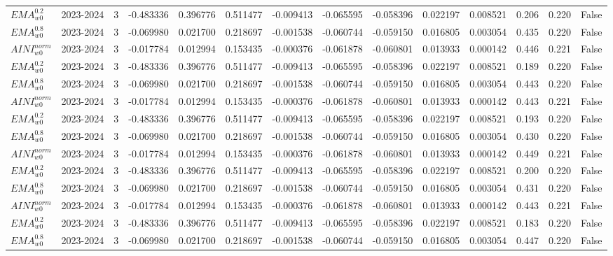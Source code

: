 \begin{tabular}{@{}llrrrrrrrrrlll@{}}
$EMA^{0.2}_{w0}$ & 2023-2024 & 3 & -0.483336 & 0.396776 & 0.511477 & -0.009413 & -0.065595 & -0.058396 & 0.022197 & 0.008521 & 0.206 & 0.220 & False \\
$EMA^{0.8}_{w0}$ & 2023-2024 & 3 & -0.069980 & 0.021700 & 0.218697 & -0.001538 & -0.060744 & -0.059150 & 0.016805 & 0.003054 & 0.435 & 0.220 & False \\
$AINI^{norm}_{w0}$ & 2023-2024 & 3 & -0.017784 & 0.012994 & 0.153435 & -0.000376 & -0.061878 & -0.060801 & 0.013933 & 0.000142 & 0.446 & 0.221 & False \\
$EMA^{0.2}_{w0}$ & 2023-2024 & 3 & -0.483336 & 0.396776 & 0.511477 & -0.009413 & -0.065595 & -0.058396 & 0.022197 & 0.008521 & 0.189 & 0.220 & False \\
$EMA^{0.8}_{w0}$ & 2023-2024 & 3 & -0.069980 & 0.021700 & 0.218697 & -0.001538 & -0.060744 & -0.059150 & 0.016805 & 0.003054 & 0.443 & 0.220 & False \\
$AINI^{norm}_{w0}$ & 2023-2024 & 3 & -0.017784 & 0.012994 & 0.153435 & -0.000376 & -0.061878 & -0.060801 & 0.013933 & 0.000142 & 0.443 & 0.221 & False \\
$EMA^{0.2}_{w0}$ & 2023-2024 & 3 & -0.483336 & 0.396776 & 0.511477 & -0.009413 & -0.065595 & -0.058396 & 0.022197 & 0.008521 & 0.193 & 0.220 & False \\
$EMA^{0.8}_{w0}$ & 2023-2024 & 3 & -0.069980 & 0.021700 & 0.218697 & -0.001538 & -0.060744 & -0.059150 & 0.016805 & 0.003054 & 0.430 & 0.220 & False \\
$AINI^{norm}_{w0}$ & 2023-2024 & 3 & -0.017784 & 0.012994 & 0.153435 & -0.000376 & -0.061878 & -0.060801 & 0.013933 & 0.000142 & 0.449 & 0.221 & False \\
$EMA^{0.2}_{w0}$ & 2023-2024 & 3 & -0.483336 & 0.396776 & 0.511477 & -0.009413 & -0.065595 & -0.058396 & 0.022197 & 0.008521 & 0.200 & 0.220 & False \\
$EMA^{0.8}_{w0}$ & 2023-2024 & 3 & -0.069980 & 0.021700 & 0.218697 & -0.001538 & -0.060744 & -0.059150 & 0.016805 & 0.003054 & 0.431 & 0.220 & False \\
$AINI^{norm}_{w0}$ & 2023-2024 & 3 & -0.017784 & 0.012994 & 0.153435 & -0.000376 & -0.061878 & -0.060801 & 0.013933 & 0.000142 & 0.443 & 0.221 & False \\
$EMA^{0.2}_{w0}$ & 2023-2024 & 3 & -0.483336 & 0.396776 & 0.511477 & -0.009413 & -0.065595 & -0.058396 & 0.022197 & 0.008521 & 0.183 & 0.220 & False \\
$EMA^{0.8}_{w0}$ & 2023-2024 & 3 & -0.069980 & 0.021700 & 0.218697 & -0.001538 & -0.060744 & -0.059150 & 0.016805 & 0.003054 & 0.447 & 0.220 & False \\

\end{tabular}
